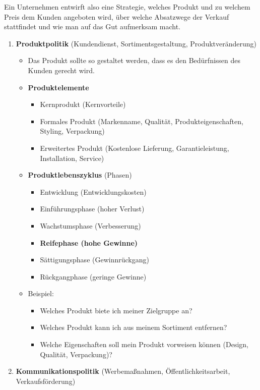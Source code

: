 Ein Unternehmen entwirft also eine Strategie, welches Produkt und zu
welchem Preis dem Kunden angeboten wird, über welche Absatzwege der
Verkauf stattfindet und wie man auf das Gut aufmerksam macht.

\begin{enumerate}
\item
  \textbf{Produktpolitik} (Kundendienst, Sortimentsgestaltung,
  Produktveränderung)

  \begin{itemize}
  \item
    Das Produkt sollte so gestaltet werden, dass es den Bedürfnissen des
    Kunden gerecht wird.
  \item
    \textbf{Produktelemente}

    \begin{itemize}
    \item
      Kernprodukt (Kernvorteile)
    \item
      Formales Produkt (Markenname, Qualität, Produkteigenschaften,
      Styling, Verpackung)
    \item
      Erweitertes Produkt (Kostenlose Lieferung, Garantieleistung,
      Installation, Service)
    \end{itemize}
  \item
    \textbf{Produktlebenszyklus} (Phasen)

    \begin{itemize}
    \item
      Entwicklung (Entwicklungskosten)
    \item
      Einführungsphase (hoher Verlust)
    \item
      Wachstumsphase (Verbesserung)
    \item
      \textbf{Reifephase (hohe Gewinne)}
    \item
      Sättigungsphase (Gewinnrückgang)
    \item
      Rückgangphase (geringe Gewinne)
    \end{itemize}
  \item
    Beispiel:

    \begin{itemize}
    \item
      Welches Produkt biete ich meiner Zielgruppe an?
    \item
      Welches Produkt kann ich aus meinem Sortiment entfernen?
    \item
      Welche Eigenschaften soll mein Produkt vorweisen können (Design,
      Qualität, Verpackung)?
    \end{itemize}
  \end{itemize}
\item
  \textbf{Kommunikationspolitik} (Werbemaßnahmen, Öffentlichkeitsarbeit,
  Verkaufsförderung)


\end{enumerate}
